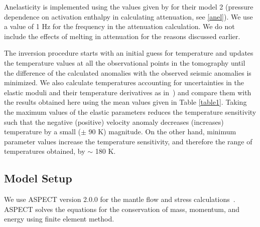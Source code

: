 \documentclass[draft,linenumbers]{agujournal2018}
\begin{document}
 Anelasticity is implemented using the values given by \citet{sobolev1996upper} for their model 2 (pressure dependence on activation enthalpy in calculating attenuation, see \ref{anel}). We use a value of 1 Hz for the frequency in the attenuation calculation. We do not include the effects of melting in attenuation for the reasons discussed earlier.

The inversion procedure starts with an initial guess for temperature and updates the temperature values at all the observational points in the tomography until the difference of the calculated anomalies with the observed seismic anomalies is minimized. We also calculate temperatures accounting for uncertainties in the elastic moduli and their temperature derivatives as in~\citep{Cammarano2003}) and compare them with the results obtained here using the mean values given in Table \ref{table1}. Taking the maximum values of the elastic parameters reduces the temperature sensitivity such that the negative (positive) velocity anomaly decreases (increases) temperature by a small ($\pm$ 90 K) magnitude. On the other hand, minimum parameter values increase the temperature sensitivity, and therefore the range of temperatures obtained, by $\sim$ 180 K. 

\subsection{Model Setup}
    
    We use ASPECT version 2.0.0 for the mantle flow and stress calculations~\citep{heister_aspect_methods2,KHB12,aspect-doi-v2.0.0}. ASPECT solves the equations for the conservation of mass, momentum, and energy using finite element method. 
    
\end{document}

